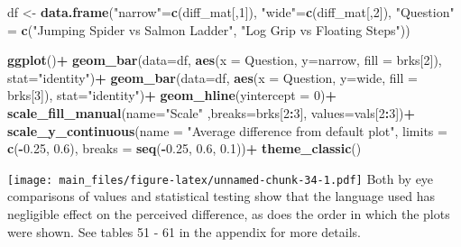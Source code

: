 \documentclass[
]{article}
\newenvironment{Shaded}{\begin{snugshade}}{\end{snugshade}}
\newcommand{\DataTypeTok}[1]{\textcolor[rgb]{0.13,0.29,0.53}{#1}}
\newcommand{\DecValTok}[1]{\textcolor[rgb]{0.00,0.00,0.81}{#1}}
\newcommand{\FloatTok}[1]{\textcolor[rgb]{0.00,0.00,0.81}{#1}}
\newcommand{\KeywordTok}[1]{\textcolor[rgb]{0.13,0.29,0.53}{\textbf{#1}}}
\newcommand{\NormalTok}[1]{#1}
\newcommand{\OperatorTok}[1]{\textcolor[rgb]{0.81,0.36,0.00}{\textbf{#1}}}
\newcommand{\StringTok}[1]{\textcolor[rgb]{0.31,0.60,0.02}{#1}}
\begin{document}
\begin{Shaded}
\begin{Highlighting}[]
\NormalTok{df <-}\StringTok{ }\KeywordTok{data.frame}\NormalTok{(}\StringTok{"narrow"}\NormalTok{=}\KeywordTok{c}\NormalTok{(diff_mat[,}\DecValTok{1}\NormalTok{]), }\StringTok{"wide"}\NormalTok{=}\KeywordTok{c}\NormalTok{(diff_mat[,}\DecValTok{2}\NormalTok{]), }\StringTok{"Question"}\NormalTok{ =}\StringTok{ }\KeywordTok{c}\NormalTok{(}\StringTok{"Jumping Spider vs Salmon Ladder"}\NormalTok{, }\StringTok{"Log Grip vs Floating Steps"}\NormalTok{))}


\KeywordTok{ggplot}\NormalTok{()}\OperatorTok{+}
\StringTok{  }\KeywordTok{geom_bar}\NormalTok{(}\DataTypeTok{data=}\NormalTok{df, }\KeywordTok{aes}\NormalTok{(}\DataTypeTok{x =}\NormalTok{ Question, }\DataTypeTok{y=}\NormalTok{narrow, }\DataTypeTok{fill =}\NormalTok{ brks[}\DecValTok{2}\NormalTok{]), }\DataTypeTok{stat=}\StringTok{"identity"}\NormalTok{)}\OperatorTok{+}
\StringTok{  }\KeywordTok{geom_bar}\NormalTok{(}\DataTypeTok{data=}\NormalTok{df, }\KeywordTok{aes}\NormalTok{(}\DataTypeTok{x =}\NormalTok{ Question, }\DataTypeTok{y=}\NormalTok{wide, }\DataTypeTok{fill =}\NormalTok{ brks[}\DecValTok{3}\NormalTok{]), }\DataTypeTok{stat=}\StringTok{"identity"}\NormalTok{)}\OperatorTok{+}
\StringTok{  }\KeywordTok{geom_hline}\NormalTok{(}\DataTypeTok{yintercept =} \DecValTok{0}\NormalTok{)}\OperatorTok{+}
\StringTok{  }\KeywordTok{scale_fill_manual}\NormalTok{(}\DataTypeTok{name=}\StringTok{"Scale"}\NormalTok{ ,}\DataTypeTok{breaks=}\NormalTok{brks[}\DecValTok{2}\OperatorTok{:}\DecValTok{3}\NormalTok{], }\DataTypeTok{values=}\NormalTok{vals[}\DecValTok{2}\OperatorTok{:}\DecValTok{3}\NormalTok{])}\OperatorTok{+}
\StringTok{  }\KeywordTok{scale_y_continuous}\NormalTok{(}\DataTypeTok{name =} \StringTok{"Average difference from default plot"}\NormalTok{, }\DataTypeTok{limits =} \KeywordTok{c}\NormalTok{(}\OperatorTok{-}\FloatTok{0.25}\NormalTok{, }\FloatTok{0.6}\NormalTok{), }\DataTypeTok{breaks =} \KeywordTok{seq}\NormalTok{(}\OperatorTok{-}\FloatTok{0.25}\NormalTok{, }\FloatTok{0.6}\NormalTok{, }\FloatTok{0.1}\NormalTok{))}\OperatorTok{+}
\StringTok{  }\KeywordTok{theme_classic}\NormalTok{()}
\end{Highlighting}
\end{Shaded}

\texttt{[image: main\_files/figure-latex/unnamed-chunk-34-1.pdf]} Both by
eye comparisons of values and statistical testing show that the language
used has negligible effect on the perceived difference, as does the
order in which the plots were shown. See tables 51 - 61 in the appendix
for more details.
\end{document}
